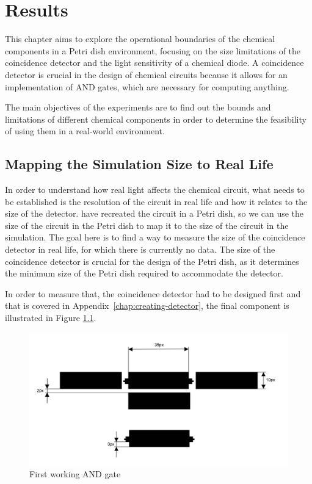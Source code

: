 \chapter{Results}
This chapter aims to explore the operational boundaries of the chemical components in a Petri dish environment, focusing on the size limitations of the coincidence detector and the light sensitivity of a chemical diode.
A coincidence detector is crucial in the design of chemical circuits because it allows for an implementation of AND gates,
which are necessary for computing anything. 

The main objectives of the experiments are to find out the bounds and limitations of different chemical components in order to determine the feasibility of using them in a real-world environment.

\section{Mapping the Simulation Size to Real Life} \label{sec:mapping-simulation-to-real-life}
In order to understand how real light affects the chemical circuit, what needs to be established is the resolution of the circuit in real life and how it relates to the size of the detector. \cite{gorecki2003chemical} have recreated the circuit in a Petri dish, so we can use the size of the circuit in the Petri dish to map it to the size of the circuit in the simulation.
The goal here is to find a way to measure the size of the coincidence detector in real life, for which there is currently no data. The size of the coincidence detector is crucial for the design of the Petri dish, as it determines the minimum size of the Petri dish required to accommodate the detector. 

In order to measure that, the coincidence detector had to be designed first and that is covered in Appendix~\ref{chap:creating-detector}, the final component is illustrated in Figure \ref{fig:and-gate}.


\begin{figure}
    \centering
    \includegraphics[width=1\linewidth]{measurement-and.jpg}
    \caption{First working AND gate}
    \label{fig:and-gate}
\end{figure}


